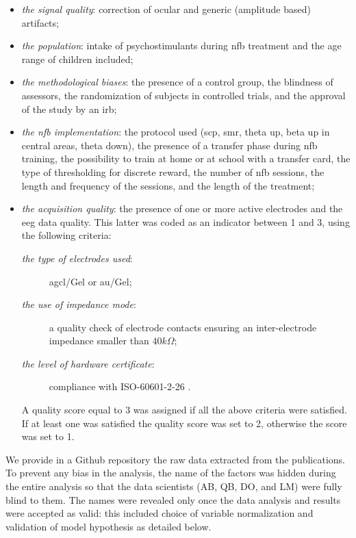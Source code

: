 \begin{itemize}
  \item \emph{the signal quality}: correction of ocular and generic (amplitude based) artifacts;
  \item \emph{the population}: intake of psychostimulants during \gls{nfb} treatment and the age range of children
  included;
  \item \emph{the methodological biases}: the presence of a control group, the blindness of assessors, 
  the randomization of subjects in controlled trials, and the approval of the study by an \gls{irb};
  \item \emph{the \gls{nfb} implementation}: the protocol used (\gls{scp}, \gls{smr}, 
  theta up, beta up in central areas, theta down), the presence of a transfer phase during \gls{nfb} training, the 
	possibility to train at home or at school with a transfer card, 
  the type of thresholding for discrete reward, the number of \gls{nfb} sessions, the length and frequency of the sessions, and the length of
  the treatment;
  \item \emph{the acquisition quality}: the presence of one or more active electrodes and the \gls{eeg} data quality. 
  This latter was coded as an indicator between 1 and 3, using the following criteria:   
	\begin{description}
	  \item[\emph{the type of electrodes used}:] \gls{agcl}/Gel or \gls{au}/Gel;
    \item[\emph{the use of impedance mode}:] a quality check of electrode contacts
		ensuring an inter-electrode impedance smaller than $40k\Omega$;  
    \item[\emph{the level of hardware certificate}:] compliance with ISO-60601-2-26 \citep{ISO-60601-2-26:2012}.
	\end{description}
	A quality score equal to 3 was assigned if all the above criteria were satisfied. If at least one was satisfied
	the quality score was set to 2, otherwise the score was set to 1.
\end{itemize}	

We provide in a Github repository \citep{Bussalb2018} the raw data extracted from the publications. To prevent any
bias in the analysis, the name of the factors was hidden during the entire analysis so that the data scientists (AB, QB,
DO, and LM) were fully blind to them. The names were revealed only once the data  analysis and results were accepted as valid: 
this included choice of variable normalization and validation of model hypothesis as detailed below.

